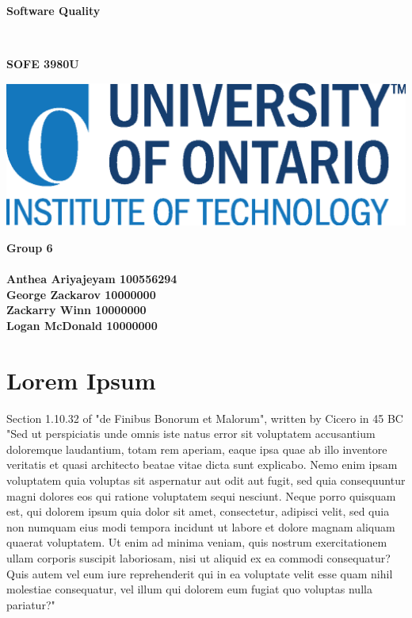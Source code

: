 \documentclass[a4paper,12pt]{article}
\author{Justin Kaipada}
\date{\today}
\title{}
\newenvironment{lmodern}{\fontfamily{lmss}\selectfont}{\par}
\begin{document}
\thispagestyle{empty} %
\begin{center}
\begin{lmodern}
{\huge\textbf{Software Quality}\par}\\
{\huge\textbf{SOFE 3980U}\par}
  \vspace{20mm}
  \includegraphics[scale=1.3]{uoit_logo.png}\\
  \vspace{40mm}
  \begin{Large}
      \textbf{Group 6}\\
      \\
      \vspace{25mm}
      \textbf{Anthea Ariyajeyam 100556294}\\
      \textbf{George Zackarov 10000000}\\
      \textbf{Zackarry Winn 10000000}\\
      \textbf{Logan McDonald 10000000}
  \end{Large}
\end{lmodern}
\end{center}
\newpage

\section*{Lorem Ipsum}
\label{sec:orgc20857c}
Section 1.10.32 of "de Finibus Bonorum et Malorum", written by Cicero
in 45 BC "Sed ut perspiciatis unde omnis iste natus error sit
voluptatem accusantium doloremque laudantium, totam rem aperiam, eaque
ipsa quae ab illo inventore veritatis et quasi architecto beatae vitae
dicta sunt explicabo. Nemo enim ipsam voluptatem quia voluptas sit
aspernatur aut odit aut fugit, sed quia consequuntur magni dolores eos
qui ratione voluptatem sequi nesciunt. Neque porro quisquam est, qui
dolorem ipsum quia dolor sit amet, consectetur, adipisci velit, sed
quia non numquam eius modi tempora incidunt ut labore et dolore magnam
aliquam quaerat voluptatem. Ut enim ad minima veniam, quis nostrum
exercitationem ullam corporis suscipit laboriosam, nisi ut aliquid ex
ea commodi consequatur? Quis autem vel eum iure reprehenderit qui in
ea voluptate velit esse quam nihil molestiae consequatur, vel illum
qui dolorem eum fugiat quo voluptas nulla pariatur?"
\end{document}
